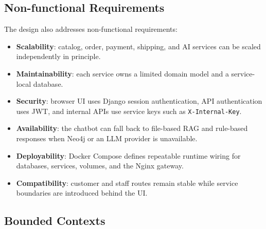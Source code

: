 \documentclass[12pt,a4paper]{article}
\begin{document}
\subsection{Non-functional Requirements}

The design also addresses non-functional requirements:

\begin{itemize}
    \item \textbf{Scalability}: catalog, order, payment, shipping, and AI services can be scaled independently in principle.
    \item \textbf{Maintainability}: each service owns a limited domain model and a service-local database.
    \item \textbf{Security}: browser UI uses Django session authentication, API authentication uses JWT, and internal APIs use service keys such as \texttt{X-Internal-Key}.
    \item \textbf{Availability}: the chatbot can fall back to file-based RAG and rule-based responses when Neo4j or an LLM provider is unavailable.
    \item \textbf{Deployability}: Docker Compose defines repeatable runtime wiring for databases, services, volumes, and the Nginx gateway.
    \item \textbf{Compatibility}: customer and staff routes remain stable while service boundaries are introduced behind the UI.
\end{itemize}

\subsection{Bounded Contexts}
\end{document}
